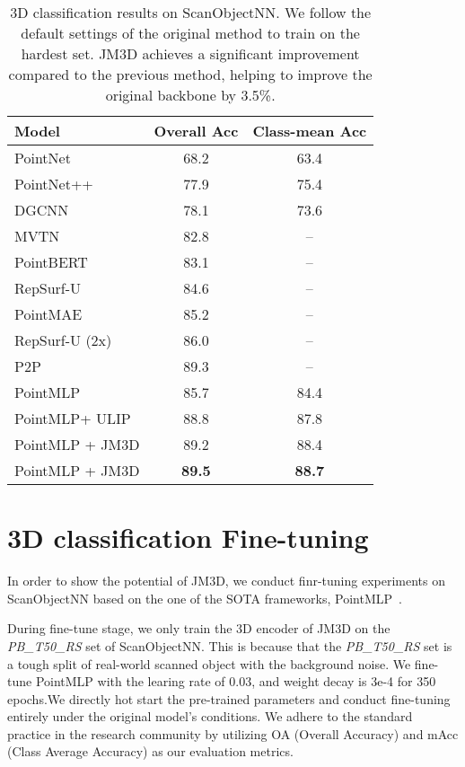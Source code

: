 \documentclass[sigconf]{acmart}
\begin{document}
\begin{table}[htb]
    \caption{3D classification results on ScanObjectNN. We follow the default settings of the original method to train on the hardest set. JM3D achieves a significant improvement compared to the previous method, helping to improve the original backbone by 3.5\%.}
    \centering
    \begin{tabular}{lcc}
    \toprule
         Model& Overall Acc & Class-mean Acc \\
         \midrule
         PointNet \cite{qi2017pointnet} &  68.2 & 63.4 \\
PointNet++ \cite{qi2017pointnet++} &  77.9 & 75.4 \\
DGCNN \cite{wu2018dgcnn} &  78.1 & 73.6 \\
MVTN \cite{hamdi2021mvtn} &  82.8 &  --\\
PointBERT \cite{yu2022point} &  83.1 &  --\\
RepSurf-U \cite{ran2022surface} & 84.6 &  --\\
PointMAE \cite{pang2022masked} & 85.2 &  --\\
RepSurf-U (2x) \cite{ran2022surface} &  86.0 &  --\\

         P2P \cite{wang2022p2p} & 89.3 & --\\
         \midrule
PointMLP \cite{marethinking} &  85.7 & 84.4 \\
PointMLP+ ULIP &  88.8 & 87.8 \\
         PointMLP + JM3D & 89.2 & 88.4 \\
         PointMLP + JM3D & \textbf{89.5} & \textbf{88.7} \\
\bottomrule
    \end{tabular}
    \label{tab:fintune-scan}
\end{table}

\section{3D classification Fine-tuning}
In order to show the potential of JM3D, we conduct finr-tuning experiments on ScanObjectNN based on the one of the SOTA frameworks, PointMLP~\cite{marethinking}.

During fine-tune stage, we only train the 3D encoder of JM3D on the \emph{PB\_T50\_RS} set of ScanObjectNN. This is because that the \emph{PB\_T50\_RS} set is a tough split of real-world scanned object with the background noise. We fine-tune PointMLP with the learing rate of 0.03, and weight decay is 3e-4 for 350 epochs.We directly hot start the pre-trained parameters and conduct fine-tuning entirely under the original model's conditions. We adhere to the standard practice in the research community by utilizing OA (Overall Accuracy) and mAcc (Class Average Accuracy) as our evaluation metrics. 
\end{document}
